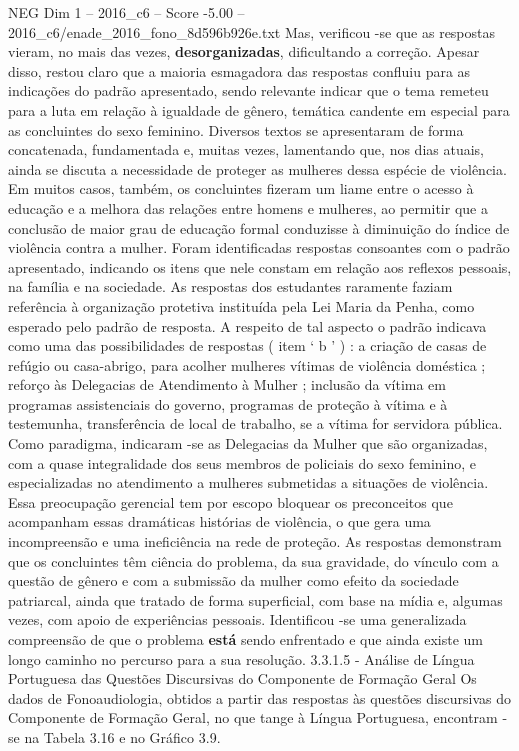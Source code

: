 \begin{textsample}{NEG Dim 1 – 2016\_c6 – Score -5.00 – 2016\_c6/enade\_2016\_fono\_8d596b926e.txt}
Mas, verificou -se que as respostas vieram, no mais das vezes, \textbf{desorganizadas}, dificultando a correção.
Apesar disso, restou claro que a maioria esmagadora das respostas confluiu para as indicações do padrão apresentado, sendo relevante indicar que o tema remeteu para a luta em relação à igualdade de gênero, temática candente em especial para as concluintes do sexo feminino.
Diversos textos se apresentaram de forma concatenada, fundamentada e, muitas vezes, lamentando que, nos dias atuais, ainda se discuta a necessidade de proteger as mulheres dessa espécie de violência.
Em muitos casos, também, os concluintes fizeram um liame entre o acesso à educação e a melhora das relações entre homens e mulheres, ao permitir que a conclusão de maior grau de educação formal conduzisse à diminuição do índice de violência contra a mulher.
Foram identificadas respostas consoantes com o padrão apresentado, indicando os itens que nele constam em relação aos reflexos pessoais, na família e na sociedade.
As respostas dos estudantes raramente faziam referência à organização protetiva instituída pela Lei Maria da Penha, como esperado pelo padrão de resposta.
A respeito de tal aspecto o padrão indicava como uma das possibilidades de respostas ( item ‘ b ’ ) : a criação de casas de refúgio ou casa-abrigo, para acolher mulheres vítimas de violência doméstica ; reforço às Delegacias de Atendimento à Mulher ; inclusão da vítima em programas assistenciais do governo, programas de proteção à vítima e à testemunha, transferência de local de trabalho, se a vítima for servidora pública.
Como paradigma, indicaram -se as Delegacias da Mulher que são organizadas, com a quase integralidade dos seus membros de policiais do sexo feminino, e especializadas no atendimento a mulheres submetidas a situações de violência.
Essa preocupação gerencial tem por escopo bloquear os preconceitos que acompanham essas dramáticas histórias de violência, o que gera uma incompreensão e uma ineficiência na rede de proteção.
As respostas demonstram que os concluintes têm ciência do problema, da sua gravidade, do vínculo com a questão de gênero e com a submissão da mulher como efeito da sociedade patriarcal, ainda que tratado de forma superficial, com base na mídia e, algumas vezes, com apoio de experiências pessoais.
Identificou -se uma generalizada compreensão de que o problema \textbf{está} sendo enfrentado e que ainda existe um longo caminho no percurso para a sua resolução. 3.3.1.5 - Análise de Língua Portuguesa das Questões Discursivas do Componente de Formação Geral Os dados de Fonoaudiologia, obtidos a partir das respostas às questões discursivas do Componente de Formação Geral, no que tange à Língua Portuguesa, encontram -se na Tabela 3.16 e no Gráfico 3.9.

\end{textsample}

